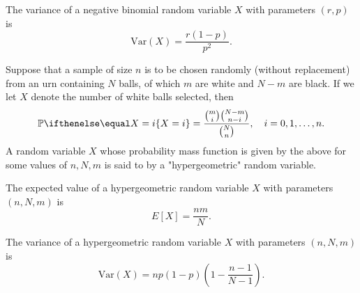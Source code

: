 \documentclass[a4paper,8pt]{article}
\begin{document}
\begin{outline}
    The variance of a negative binomial random variable \(X\) with parameters \((r, p)\) is \[\text{Var}(X) = \frac{r(1-p)}{p^2}\text{.}\]

    Suppose that a sample of size \(n\) is to be chosen randomly (without replacement) from an urn containing \(N\) balls,
    of which \(m\) are white and \(N-m\) are black. If we let \(X\) denote the number of white balls selected, then
    \[ \bbp[X=i] = \frac{\binom{m}{i}\binom{N-m}{n-i}}{\binom{N}{n}},\quad i=0,1,\ldots,n\text{.} \]
    A random variable \(X\) whose probability mass function is given by the above for some values of \(n, N, m\) is said to
    by a "hypergeometric" random variable.

    The expected value of a hypergeometric random variable \(X\) with parameters \((n, N, m)\) is \[E[X] = \frac{nm}{N}\text{.}\]

    The variance of a hypergeometric random variable \(X\) with parameters \((n, N, m)\) is
    \[\text{Var}(X) = np(1-p)\left(1 - \frac{n-1}{N-1}\right)\text{.}\]

\end{outline}
\end{document}
